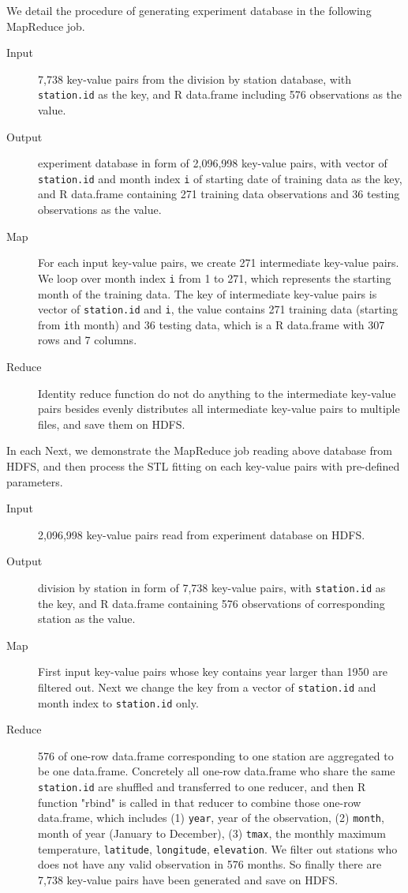 We detail the procedure of generating experiment database in the following 
MapReduce job.

\begin{description}
  \item[Input] 7,738 key-value pairs from the division by station database, with 
  \texttt{station.id} as the key, and R data.frame including 576 observations as
  the value.
  \item[Output] experiment database in form of 2,096,998 key-value pairs, with 
  vector of \texttt{station.id} and month index \texttt{i} of starting date of 
  training data as the key, and R data.frame containing 271 training data 
  observations and 36 testing observations as the value.
  \item[Map] For each input key-value pairs, we create 271 intermediate key-value
  pairs. We loop over month index \texttt{i} from 1 to 271, which represents the
  starting month of the training data. The key of intermediate key-value pairs
  is vector of \texttt{station.id} and \texttt{i}, the value contains 271 
  training data (starting from \texttt{i}th month) and 36 testing data, which is 
  a R data.frame with 307 rows and 7 columns.
  \item[Reduce] Identity reduce function do not do anything to the intermediate 
  key-value pairs besides evenly distributes all intermediate key-value pairs to 
  multiple files, and save them on HDFS.
\end{description} 

In each
Next, we demonstrate the MapReduce job reading above database from HDFS, and then
process the STL fitting on each key-value pairs with pre-defined parameters.

\begin{description}
  \item[Input] 2,096,998 key-value pairs read from experiment database on HDFS.
  \item[Output] division by station in form of 7,738 key-value pairs, with 
  \texttt{station.id} as the key, and R data.frame containing 576 observations 
  of corresponding station as the value.
  \item[Map]First input key-value pairs whose key contains year larger than 1950
  are filtered out. Next we change the key from a vector of \texttt{station.id} 
  and month index to \texttt{station.id} only. 
  \item[Reduce] 576 of one-row data.frame corresponding to one station are 
  aggregated to be one data.frame. Concretely all one-row data.frame who share
  the same \texttt{station.id} are shuffled and transferred to one reducer, and 
  then R function "rbind" is called in that reducer to combine those one-row 
  data.frame, which includes (1) \texttt{year}, year of the observation, 
  (2) \texttt{month}, month of year (January to December), (3) \texttt{tmax}, 
  the monthly maximum temperature, \texttt{latitude}, \texttt{longitude}, 
  \texttt{elevation}. We filter out stations who does not have any valid
  observation in 576 months. So finally there are 7,738 key-value pairs have been
  generated and save on HDFS. 
\end{description} 

